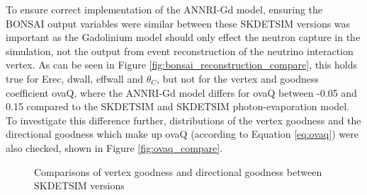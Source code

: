To ensure correct implementation of the ANNRI-Gd model, ensuring the BONSAI output variables were similar between these SKDETSIM versions was important as the Gadolinium model should only effect the neutron capture in the simulation, not the output from event reconstruction of the neutrino interaction vertex. As can be seen in Figure \ref{fig:bonsai_reconstruction_compare}, this holds true for Erec, dwall, effwall and $\theta_C$, but not for the vertex and goodness coefficient ovaQ, where the ANNRI-Gd model differs for ovaQ between -0.05 and 0.15 compared to the SKDETSIM and SKDETSIM photon-evaporation model. To investigate this difference further, distributions of the vertex goodness and the directional goodness which make up ovaQ (according to Equation \ref{eq:ovaq}) were also checked, shown in Figure \ref{fig:ovaq_compare}.

\begin{figure}[!htbp]
    \centering
    
    \caption{Comparisons of vertex goodness and directional goodness between SKDETSIM versions} \label{fig:ovaq_compare} 
    
     \label{fig:gvtx_squared} \hfill 
     \label{fig:gdir_squared} \par
    
        
\end{figure}

